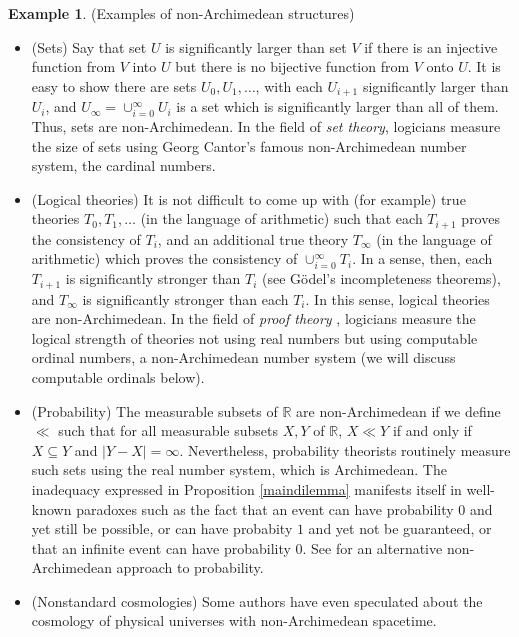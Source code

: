 \documentclass[reqno]{article}
\theoremstyle{definition}
\newtheorem{example}[theorem]{Example}
\begin{document}
\begin{example}
\label{nonexamples}
(Examples of non-Archimedean structures)
    \begin{itemize}
        \item
        (Sets)
        Say that set $U$ is significantly larger than set $V$ if there is an injective
        function from $V$ into $U$ but there is no bijective function from $V$
        onto $U$. It is easy to show there are sets $U_0,U_1,\ldots$, with each
        $U_{i+1}$ significantly larger than $U_i$, and $U_\infty=\cup_{i=0}^\infty U_i$
        is a set which is significantly larger than all of them. Thus, sets are
        non-Archimedean. In the field of \emph{set theory}, logicians measure
        the size of sets using Georg Cantor's famous non-Archimedean number system,
        the cardinal numbers.
        \item
        (Logical theories)
        It is not difficult to come up with (for example) true
        theories $T_0,T_1,\ldots$ (in the language of arithmetic) such that
        each $T_{i+1}$ proves the consistency of $T_i$, and an additional
        true theory $T_\infty$ (in the language of arithmetic)
        which proves the consistency of $\cup_{i=0}^\infty T_i$.
        In a sense, then, each $T_{i+1}$ is significantly stronger than $T_i$
        (see G\"odel's incompleteness theorems), and $T_\infty$ is
        significantly stronger than each $T_i$. In this sense, logical theories
        are non-Archimedean. In the field
        of \emph{proof theory} \cite{pohlers2008proof},
        logicians measure the logical strength of theories not using real numbers
        but using computable ordinal numbers, a non-Archimedean number system
        (we will discuss computable ordinals below).
        \item
        (Probability)
        The measurable subsets of $\mathbb R$ are non-Archimedean
        if we define $\ll$ such that for all measurable subsets
        $X,Y$ of $\mathbb R$, $X\ll Y$ if and only if
        $X\subseteq Y$ and $|Y-X|=\infty$.
        Nevertheless, probability theorists routinely
        measure such sets using the real number system, which is Archimedean.
        The inadequacy expressed in Proposition \ref{maindilemma}
        manifests itself in well-known paradoxes such as the fact that
        an event can have probability $0$ and yet still be possible,
        or can have probabity $1$ and yet not be guaranteed,
        or that an infinite event can have probability $0$.
        See \cite{benci2013non} for an alternative non-Archimedean approach
        to probability.
        \item
        (Nonstandard cosmologies)
        Some authors \cite{andreka2012logic} \cite{rosinger2007cosmic} have
        even speculated about the cosmology of physical universes
        with non-Archimedean spacetime.
    \end{itemize}
\end{example}
\end{document}

